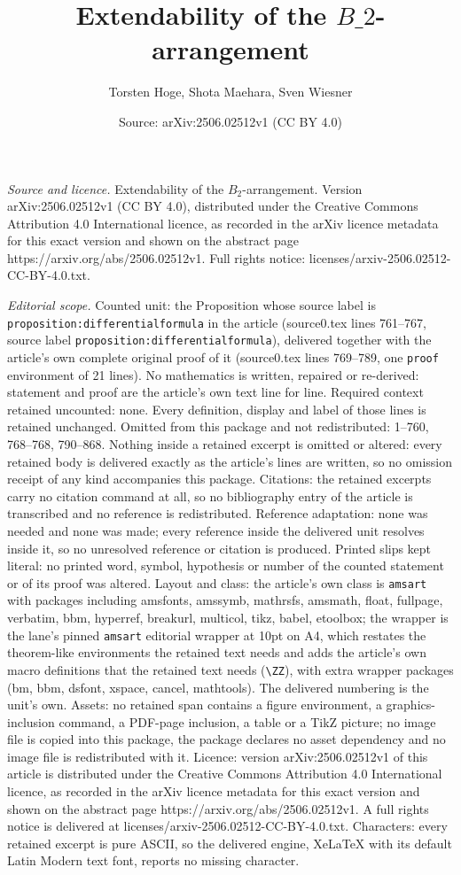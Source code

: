 \documentclass[10pt,a4paper]{amsart}
\title[Extendability of the $B\_2$-arrangement]{Extendability of the $B\_2$-arrangement}
\author{Torsten Hoge, Shota Maehara, Sven Wiesner}
\date{Source: arXiv:2506.02512v1 (CC BY 4.0)}
\begin{document}
\maketitle

\noindent\emph{Source and licence.} Extendability of the $B_2$-arrangement. Version arXiv:2506.02512v1 (CC BY 4.0), distributed under the Creative Commons Attribution 4.0 International licence, as recorded in the arXiv licence metadata for this exact version and shown on the abstract page https://arxiv.org/abs/2506.02512v1. Full rights notice: licenses/arxiv-2506.02512-CC-BY-4.0.txt.\par\smallskip

\noindent\textit{Editorial scope.} Counted unit: the Proposition whose source label is \texttt{proposition:differentialformula} in the article (source0.tex lines 761--767, source label \texttt{proposition:differentialformula}), delivered together with the article's own complete original proof of it (source0.tex lines 769--789, one \texttt{proof} environment of 21 lines). No mathematics is written, repaired or re-derived: statement and proof are the article's own text line for line. Required context retained uncounted: none. Every definition, display and label of those lines is retained unchanged. Omitted from this package and not redistributed: 1--760, 768--768, 790--868. Nothing inside a retained excerpt is omitted or altered: every retained body is delivered exactly as the article's lines are written, so no omission receipt of any kind accompanies this package. Citations: the retained excerpts carry no citation command at all, so no bibliography entry of the article is transcribed and no reference is redistributed. Reference adaptation: none was needed and none was made; every reference inside the delivered unit resolves inside it, so no unresolved reference or citation is produced. Printed slips kept literal: no printed word, symbol, hypothesis or number of the counted statement or of its proof was altered. Layout and class: the article's own class is \texttt{amsart} with packages including amsfonts, amssymb, mathrsfs, amsmath, float, fullpage, verbatim, bbm, hyperref, breakurl, multicol, tikz, babel, etoolbox; the wrapper is the lane's pinned \texttt{amsart} editorial wrapper at 10pt on A4, which restates the theorem-like environments the retained text needs and adds the article's own macro definitions that the retained text needs (\texttt{\textbackslash ZZ}), with extra wrapper packages (bm, bbm, dsfont, xspace, cancel, mathtools). The delivered numbering is the unit's own. Assets: no retained span contains a figure environment, a graphics-inclusion command, a PDF-page inclusion, a table or a TikZ picture; no image file is copied into this package, the package declares no asset dependency and no image file is redistributed with it. Licence: version arXiv:2506.02512v1 of this article is distributed under the Creative Commons Attribution 4.0 International licence, as recorded in the arXiv licence metadata for this exact version and shown on the abstract page https://arxiv.org/abs/2506.02512v1. A full rights notice is delivered at licenses/arxiv-2506.02512-CC-BY-4.0.txt. Characters: every retained excerpt is pure ASCII, so the delivered engine, XeLaTeX with its default Latin Modern text font, reports no missing character.
\end{document}

